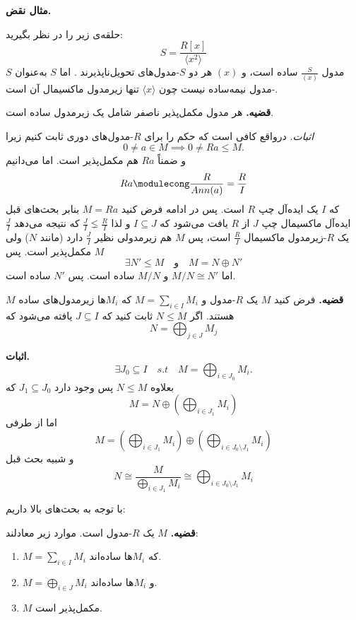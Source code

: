 \textbf{مثال نقض.}

حلقه‌ی زیر را در نظر بگیرید:
\[
    S = \frac{R[x]}{\langle x^2 \rangle}
\]
مدول \( \frac{S}{(x)} \) ساده است، و \( (x) \) هر دو
\(S\)-مدول‌های
تحویل‌ناپذیرند .
اما
\(S\)
به‌عنوان
\( S \)-مدول
نیمه‌ساده نیست چون \( \langle x \rangle \) تنها زیرمدول ماکسیمال آن است.


\textbf{قضیه.} هر مدول مکمل‌پذیر ناصفر شامل یک زیرمدول ساده است.

\textit{اثبات.}
درواقع کافی است که حکم را برای
\(R\)-مدول‌های
دوری ثابت کنیم زیرا
\[
    0 \neq a \in M \implies 0 \neq Ra \leqslant M.
\]
و ضمناً
\(Ra\)
هم مکمل‌پذیر است. اما می‌دانیم
\[
    Ra \modulecong \frac{R}{\mathop{Ann}(a)} = \frac{R}{I}
\]
که
\(I\)
یک ایده‌آل چپ
\(R\)
است. پس در ادامه فرض کنید
\(M = Ra\)
بنابر بحث‌های قبل ایده‌آل ماکسیمال چپ
\(J\)
از
\(R\)
یافت می‌شود که
\(I \subseteq J\)
و لذا
\( \frac{J}{I} \lneq \frac{R}{I} \)
که نتیجه می‌دهد
\(\frac{J}{I}\)
یک
\(R\)-زیرمدول
ماکسیمال
\(\frac{R}{I}\)
است، پس
\(M\)
هم زیرمدولی نظیر
\(\frac{J}{I}\)
دارد
(مانند \(N\))
ولی
\(M\)
مکمل‌پذیر است. پس
\[
    \exists N' \leq M \quad \text{و} \quad M = N \oplus N'
\]
اما
\( M/N \cong N' \)
و
\( M/N \)
ساده است. پس
\( N' \)
ساده است.



\hrulefill

\textbf{قضیه.} فرض کنید \( M \) یک \( R \)-مدول و \( M = \sum_{i \in I} M_i \) که \( M_i \)ها زیرمدول‌های ساده \( M \) هستند. اگر
\( N \leqslant M \)
ثابت کنید که
\(J \subseteq I\)
یافته می‌شود که
\[
    N = \bigoplus_{j \in J} M_j
\]

\textbf{اثبات.}
\[
    \exists J_0 \subseteq I \quad s.t \quad M = \bigoplus_{i \in J_0} M_i.
\]
بعلاوه
\( N \leqslant M \)
پس وجود دارد
\( J_1 \subseteq J_0 \)
که
\[
    M = N \oplus \left( \bigoplus_{i \in J_1} M_i \right)
\]
اما از طرفی
\[
    M = \left( \bigoplus_{i \in J_1} M_i \right) \oplus \left( \bigoplus_{i \in J_0 \setminus J_1} M_i \right)
\]
و شبیه بحث قبل
\[
    N \cong \frac{M}{\bigoplus_{i \in J_1} M_i} \cong \bigoplus_{i \in J_0 \setminus J_1} M_i
\]

\hrulefill

با توجه به بحث‌های بالا داریم:

\textbf{قضیه.} \( M \) یک \( R \)-مدول است. موارد زیر معادلند:
\begin{enumerate}
    \item \( M = \sum_{i \in I} M_i \) که \( M_i \)ها ساده‌اند.
    \item \( M = \bigoplus_{i \in J} M_i \) و \( M_i \)ها ساده‌اند.
    \item \( M \) مکمل‌پذیر است.
\end{enumerate}

